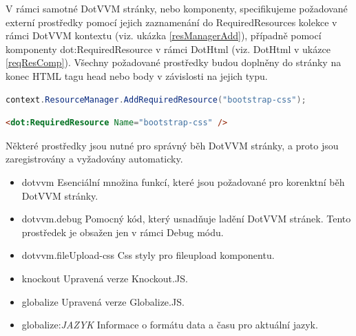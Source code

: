 V rámci samotné DotVVM stránky, nebo komponenty, specifikujeme požadované externí prostředky pomocí jejich zaznamenání do RequiredResources kolekce v rámci DotVVM kontextu (viz. ukázka \ref{resManagerAdd}), případně pomocí komponenty dot:RequiredResource v rámci DotHtml (viz. DotHtml v ukázce \ref{reqResComp}).
Všechny požadované prostředky budou doplněny do stránky na konec HTML tagu head nebo body v závislosti na jejich typu.

\begin{lstlisting}[language=c#, caption=Specifikace požadovaného prostředku v rámci C# kódu,label=resManagerAdd,captionpos=t]
context.ResourceManager.AddRequiredResource("bootstrap-css");

\end{lstlisting}

\begin{lstlisting}[language=Html, caption=Specifikace požadovaného prostředku v rámci DotHtml,label=reqResComp,captionpos=t]
<dot:RequiredResource Name="bootstrap-css" />

\end{lstlisting}
\pagebreak
Některé prostředky jsou nutné pro správný běh DotVVM stránky, a proto jsou zaregistrovány a vyžadovány automaticky.

\begin{itemize}
  \setlength\itemsep{0.2em}
    \item dotvvm\newline
    Esenciální množina funkcí, které jsou požadované pro korenktní běh DotVVM stránky.
    \item dotvvm.debug\newline
    Pomocný kód, který usnadňuje ladění DotVVM stránek. Tento prostředek je obsažen jen v rámci Debug módu.
    \item dotvvm.fileUpload-css\newline
    Css styly pro fileupload komponentu.
    \item knockout\newline
    Upravená verze Knockout.JS.
    \item globalize\newline
    Upravená verze Globalize.JS.
    \item globalize:\textit{JAZYK}
    Informace o formátu data a času pro aktuální jazyk.
\end{itemize}
